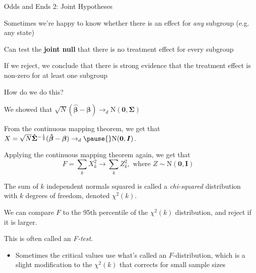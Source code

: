 \documentclass[11pt,english,handout]{beamer}
\newenvironment{wideitemize}{\itemize\addtolength{\itemsep}{10pt}}{\enditemize}
\begin{document}
\begin{frame}{Odds and Ends 2: Joint Hypotheses}
	\begin{wideitemize}
		\item
		Sometimes we're happy to know whether there is an effect for \textit{any} subgroup (e.g. any state)
		
		\pause
		\item
		Can test the \textbf{joint null} that there is no treatment effect for every subgroup
		
		\pause
		\item
		If we reject, we conclude that there is strong evidence that the treatment effect is non-zero for at least one subgroup
		
		\pause
		\item
		How do we do this? 
		
	\end{wideitemize}	
\end{frame}

\begin{frame}
	\begin{wideitemize}
	\item
	We showed that $\sqrt{N} (\bm{\hat\beta} - \bm{\beta}) \rightarrow_d \mathrm{N}(\bm{0}, \bm{\Sigma})$
	
	\item
	From the continuous mapping theorem, we get that $X = \sqrt{N} \bm{\hat\Sigma}^{-\frac{1}{2}} (\bm{\hat\beta} - \bm{\beta}) \rightarrow_d \pause{} \mathrm{N}(\bm{0}, \bm{I})$.
	
	
	\item
	Applying the continuous mapping theorem again, we get that 
	$$F = \sum_k X_k^2 \rightarrow \sum_k Z_k^2, \text{ where } Z \sim \mathrm{N}(\bm{0}, \bm{I})$$
	
	\pause
	\item
	The sum of $k$ independent normals squared is called a \textit{chi-squared} distribution with $k$ degrees of freedom, denoted $\chi^2(k)$.
	
	\pause
	\item
	We can compare $F$ to the 95th percentile of the $\chi^2(k)$ distribution, and reject if it is larger. 
	
	\pause
	\item
	This is often called an \textit{F-test}.
	\begin{itemize}
		\item
		Sometimes the critical values use what's called an $F$-distribution, which is a slight modification to the $\chi^2(k)$ that corrects for small sample sizes
	\end{itemize}	
	\end{wideitemize}	
\end{frame}
\end{document}
